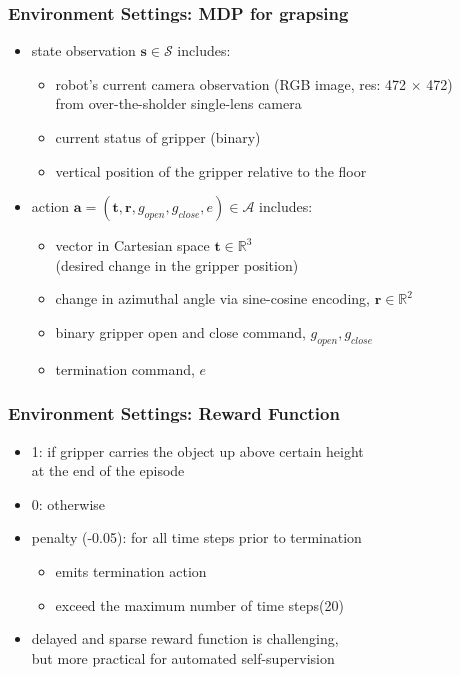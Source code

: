 \documentclass{beamer}
\renewcommand{\vec}[1]{\mathbf{#1}}
\newcommand{\fifthSec}{Environment Settings}
\begin{document}
    \begin{frame}
      \frametitle{\fifthSec : MDP for grapsing}
      \begin{itemize}
        \item state observation $\vec{s} \in \mathcal{S}$ includes:
        \begin{itemize}
          \item robot's current camera observation (RGB image, res: 472 $\times$ 472) \\
                from over-the-sholder single-lens camera
          \item current status of gripper (binary)
          \item vertical position of the gripper relative to the floor
        \end{itemize}
        \item action $\vec{a} = (\vec{t}, \vec{r}, g_{open}, g_{close}, e) \in \mathcal{A}$ includes:
        \begin{itemize}
          \item vector in Cartesian space $\vec{t} \in \mathbb{R}^3$ \\ 
                (desired change in the gripper position)
          \item change in azimuthal angle via sine-cosine encoding, $\vec{r} \in \mathbb{R}^2$
          \item binary gripper open and close command, $g_{open}, g_{close}$
          \item termination command, $e$
        \end{itemize}
      \end{itemize}
    \end{frame}

    \begin{frame}
      \frametitle{\fifthSec : Reward Function}
      \begin{itemize}
        \item 1: if gripper carries the object up above certain height \\ 
              at the end of the episode
        \item 0: otherwise
        \item penalty (-0.05): for all time steps prior to termination
        \begin{itemize}
          \item emits termination action
          \item exceed the maximum number of time steps(20)
          \linebreak
        \end{itemize}
        \item delayed and sparse reward function is challenging, \\
              but more practical for automated self-supervision
      \end{itemize}
    \end{frame}
\end{document}
